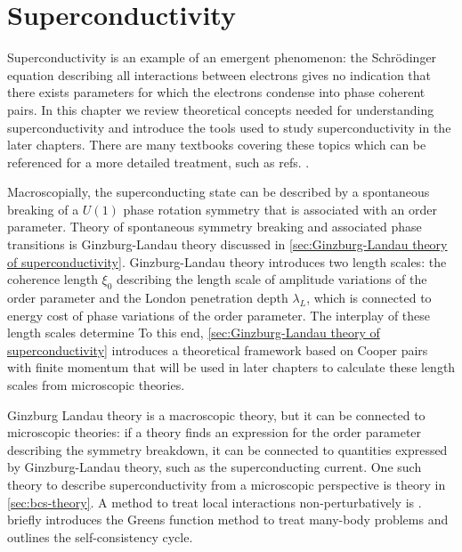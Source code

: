 \documentclass[../notes.tex]{subfiles}
\begin{document}
\chapter{Superconductivity} \label{ch:superconductivity}

Superconductivity is an example of an emergent phenomenon: the Schrödinger equation describing all interactions between electrons gives no indication that there exists parameters for which the electrons condense into phase coherent pairs.
In this chapter we review theoretical concepts needed for understanding superconductivity and introduce the tools used to study superconductivity in the later chapters.
There are many textbooks covering these topics which can be referenced for a more detailed treatment, such as refs. \cite{colemanIntroductionManyBodyPhysics2015, tinkhamIntroductionSuperconductivity1996, bruusManyBodyQuantumTheory2004, larkinTheoryFluctuationsSuperconductors2005, bennemannSuperconductivity2008}.

Macroscopially, the superconducting state can be described by a spontaneous breaking of a \(U(1)\) phase rotation symmetry that is associated with an order parameter.
Theory of spontaneous symmetry breaking and associated phase transitions is Ginzburg-Landau theory discussed in \cref{sec:Ginzburg-Landau theory of superconductivity}.
Ginzburg-Landau theory introduces two length scales: the coherence length \(\xi_0\) describing the length scale of amplitude variations of the order parameter and the London penetration depth \(\lambda_L\), which is connected to energy cost of phase variations of the order parameter.
The interplay of these length scales determine 
To this end, \cref{sec:Ginzburg-Landau theory of superconductivity}  introduces a theoretical framework based on Cooper pairs with finite momentum \cite{wittBypassingLatticeBCS2024} that will be used in later chapters to calculate these length scales from microscopic theories.

Ginzburg Landau theory is a macroscopic theory, but it can be connected to microscopic theories: if a theory finds an expression for the order parameter describing the symmetry breakdown, it can be connected to quantities expressed by Ginzburg-Landau theory, such as the superconducting current.
One such theory to describe superconductivity from a microscopic perspective is  theory in \cref{sec:bcs-theory}.
A method to treat local interactions non-perturbatively is .  briefly introduces the Greens function method to treat many-body problems and outlines the  self-consistency cycle.
\end{document}
